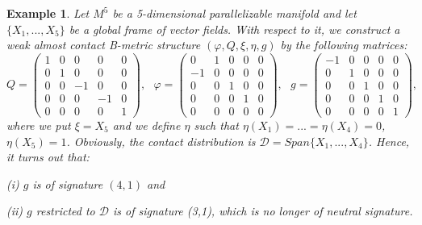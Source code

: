 \documentclass{article}
\newtheorem{example}[theorem]{Example}
\begin{document}
\begin{example}
	Let $M^5$ be a 5-dimensional parallelizable manifold and let $\{X_1,...,X_5\}$ be a global frame of vector fields. With respect to it, we construct a weak almost contact B-metric structure $(\varphi,Q,\xi,\eta,g)$ by the following matrices: 
	$$Q=
	\begin{pmatrix}
		1 & 0 & 0 & 0 & 0 \\
		0 & 1  & 0 & 0 & 0\\
		0 & 0 & -1& 0 & 0\\
	    0 & 0 & 0 & -1 & 0\\
		0 & 0 & 0 & 0 & 1
	\end{pmatrix}, \ \ \
	\varphi=
	\begin{pmatrix}
		0 & 1 & 0 & 0 & 0 \\
-1 & 0  & 0 & 0 & 0\\
0& 0 & 1& 0 & 0\\
0 & 0 & 0 & 1 & 0\\
0 & 0 & 0 & 0 & 0
	\end{pmatrix}, \ \ \
	g= 	\begin{pmatrix}
		-1 & 0 & 0 & 0 & 0 \\
		0 & 1  & 0 & 0 & 0\\
		0 & 0 & 1& 0 & 0\\
		0 & 0 & 0 & 1 & 0\\
		0 & 0 & 0 & 0 & 1
	\end{pmatrix},
	$$
	 where we put $\xi=X_5$ and we define $\eta$ such that $\eta(X_1)=...=\eta(X_4)=0$, $\eta(X_5)=1$. Obviously, the contact distribution is $\mathcal{D}=Span\{X_1,...,X_4\}$. Hence, it turns out that:\medskip
	
	\noindent (i) $g$ is of signature $(4,1)$ and  \smallskip
	
	\noindent(ii) $g$ restricted to $\mathcal{D}$ is of signature (3,1), which is no longer of neutral signature.	
\end{example}
\end{document}
